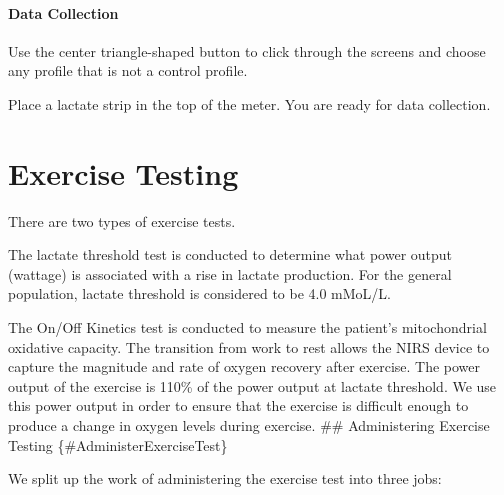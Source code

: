 \documentclass[
]{book}
\begin{document}
\hypertarget{Appendix-Instruments-LactateMeter-Usage-DataCollection}{%
\subsubsection{Data Collection}\label{Appendix-Instruments-LactateMeter-Usage-DataCollection}}

Use the center triangle-shaped button to click through the screens and choose any profile that is not a control profile.

Place a lactate strip in the top of the meter. You are ready for data collection.

\hypertarget{ExerciseTesting}{%
\chapter{Exercise Testing}\label{ExerciseTesting}}

There are two types of exercise tests.

The lactate threshold test is conducted to determine what power output (wattage) is associated with a rise in lactate production. For the general population, lactate threshold is considered to be 4.0 mMoL/L.

The On/Off Kinetics test is conducted to measure the patient's mitochondrial oxidative capacity. The transition from work to rest allows the NIRS device to capture the magnitude and rate of oxygen recovery after exercise. The power output of the exercise is 110\% of the power output at lactate threshold. We use this power output in order to ensure that the exercise is difficult enough to produce a change in oxygen levels during exercise.
\#\# Administering Exercise Testing \{\#AdministerExerciseTest\}

We split up the work of administering the exercise test into three jobs:
\end{document}
